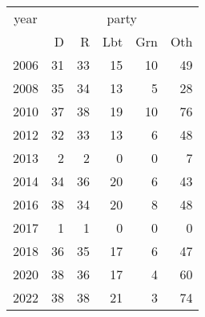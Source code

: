 \footnotesize\begin{tabular}[t]{lrrrrr}
\toprule
\multicolumn{1}{c}{year} & \multicolumn{5}{c}{party} \\
\cmidrule(l{3pt}r{3pt}){1-1} \cmidrule(l{3pt}r{3pt}){2-6}
  & D & R & Lbt & Grn & Oth\\
\midrule
2006 & 31 & 33 & 15 & 10 & 49\\
2008 & 35 & 34 & 13 & 5 & 28\\
2010 & 37 & 38 & 19 & 10 & 76\\
2012 & 32 & 33 & 13 & 6 & 48\\
2013 & 2 & 2 & 0 & 0 & 7\\
2014 & 34 & 36 & 20 & 6 & 43\\
2016 & 38 & 34 & 20 & 8 & 48\\
2017 & 1 & 1 & 0 & 0 & 0\\
2018 & 36 & 35 & 17 & 6 & 47\\
2020 & 38 & 36 & 17 & 4 & 60\\
2022 & 38 & 38 & 21 & 3 & 74\\
\bottomrule
\end{tabular}
